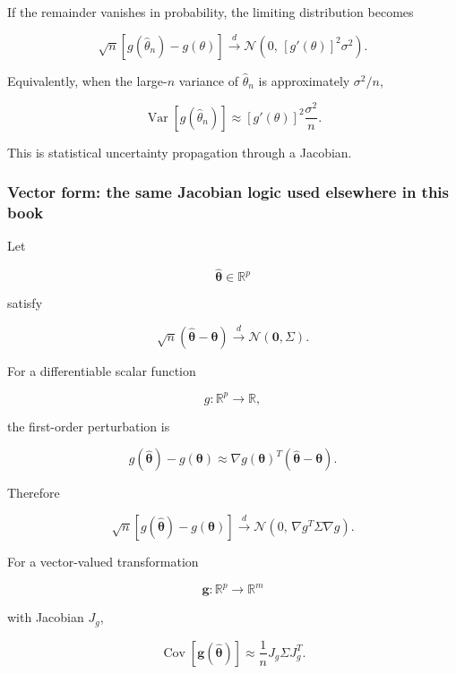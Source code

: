 If the remainder vanishes in probability, the limiting distribution becomes

\[
\boxed{
\sqrt n
\left[
g(\widehat\theta_n)-g(\theta)
\right]
\xrightarrow{d}
\mathcal N
\left(
0,\,
[g'(\theta)]^2\sigma^2
\right)
}.
\]

Equivalently, when the large-\(n\) variance of \(\widehat\theta_n\) is approximately \(\sigma^2/n\),

\[
\operatorname{Var}\!\left[g(\widehat\theta_n)\right]
\approx
[g'(\theta)]^2
\frac{\sigma^2}{n}.
\]

This is statistical uncertainty propagation through a Jacobian.

\subsubsection{Vector form: the same Jacobian logic used elsewhere in this book}\label{02-foundations-ii-ch030-vector-form-the-same-jacobian-logic-used-elsewhere-in-this-book}

\hypertarget{02-foundations-ii-ch030-vector-form-the-same-jacobian-logic-used-elsewhere-in-this-book}{}

Let

\[
\widehat{\boldsymbol\theta}\in\mathbb R^p
\]

satisfy

\[
\sqrt n
(\widehat{\boldsymbol\theta}-\boldsymbol\theta)
\xrightarrow{d}
\mathcal N(\mathbf 0,\Sigma).
\]

For a differentiable scalar function

\[
g:\mathbb R^p\to\mathbb R,
\]

the first-order perturbation is

\[
g(\widehat{\boldsymbol\theta})
-
g(\boldsymbol\theta)
\approx
\nabla g(\boldsymbol\theta)^T
(\widehat{\boldsymbol\theta}-\boldsymbol\theta).
\]

Therefore

\[
\boxed{
\sqrt n
\left[
g(\widehat{\boldsymbol\theta})
-
g(\boldsymbol\theta)
\right]
\xrightarrow{d}
\mathcal N
\left(
0,\,
\nabla g^T
\Sigma
\nabla g
\right)
}.
\]

For a vector-valued transformation

\[
\mathbf g:\mathbb R^p\to\mathbb R^m
\]

with Jacobian \(J_g\),

\[
\boxed{
\operatorname{Cov}
\left[
\mathbf g(\widehat{\boldsymbol\theta})
\right]
\approx
\frac1n
J_g
\Sigma
J_g^T
}.
\]

